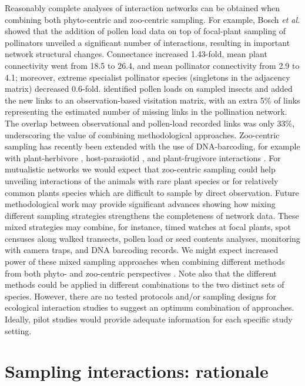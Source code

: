 \documentclass[12pt]{article}
\begin{document}
Reasonably complete analyses of interaction networks can be obtained when combining both phyto-centric and zoo-centric sampling. For example, Bosch \emph{et al.} \citeyearpar{Bosch:2009jga} showed that the addition of pollen load data on top of focal-plant sampling of pollinators unveiled a significant number of interactions, resulting in important network structural changes. Connectance increased 1.43-fold, mean plant connectivity went from 18.5 to 26.4, and mean pollinator connectivity from 2.9 to 4.1; moreover, extreme specialist pollinator species (singletons in the adjacency matrix) decreased 0.6-fold. \citeyearpar[Olesen \emph{et al.}][]{Olesen:2011a} identified pollen loads on sampled insects and added the new links to an observation-based visitation matrix, with an extra 5\% of links representing the estimated number of missing links in the pollination network. The overlap between observational and pollen-load recorded links was only 33\%, underscoring the value of combining methodological approaches. Zoo-centric sampling has recently been extended with the use of DNA-barcoding, for example with plant-herbivore \citep{JuradoRivera:2009cp}, host-parasiotid \citep{Wirta:2014aa}, and plant-frugivore interactions \citep{GonzalezVaro:2014ij}. For mutualistic networks we would expect that zoo-centric sampling could help unveiling interactions of the animals with rare plant species or for relatively common plants species which are difficult to sample by direct observation. Future methodological work may provide significant advances showing how mixing different sampling strategies strengthens the completeness of network data. These mixed strategies may combine, for instance, timed watches at focal plants, spot censuses along walked transects, pollen load or seed contents analyses, monitoring with camera traps, and DNA barcoding records. We might expect increased power of these mixed sampling approaches when combining different methods from both phyto- and zoo-centric perspectives \citep{Bosch:2009jga,Bluthgen:2010p9}. Note also that the different methods could be applied in different combinations to the two distinct sets of species. However, there are no tested protocols and\slash or sampling designs for ecological interaction studies to suggest an optimum combination of approaches. Ideally, pilot studies would provide adequate information for each specific study setting.

\section*{Sampling interactions: rationale}
\label{samplinginteractions:rationale}
\end{document}
